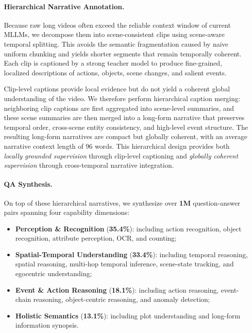 \documentclass[11pt, letterpaper]{template}
\theoremstyle{plain}
\theoremstyle{definition}
\theoremstyle{remark}
\begin{document}
\paragraph{Hierarchical Narrative Annotation.}
Because raw long videos often exceed the reliable context window of current MLLMs, we decompose them into scene-consistent clips using scene-aware temporal splitting. This avoids the semantic fragmentation caused by naive uniform chunking and yields shorter segments that remain temporally coherent. Each clip is captioned by a strong teacher model to produce fine-grained, localized descriptions of actions, objects, scene changes, and salient events.

Clip-level captions provide local evidence but do not yield a coherent global understanding of the video. We therefore perform hierarchical caption merging: neighboring clip captions are first aggregated into scene-level summaries, and these scene summaries are then merged into a long-form narrative that preserves temporal order, cross-scene entity consistency, and high-level event structure. The resulting long-form narratives are compact but globally coherent, with an average narrative context length of 96 words. This hierarchical design provides both \emph{locally grounded supervision} through clip-level captioning and \emph{globally coherent supervision} through cross-temporal narrative integration.

\paragraph{QA Synthesis.}
On top of these hierarchical narratives, we synthesize over \textbf{1M} question-answer pairs spanning four capability dimensions:
\begin{itemize}[leftmargin=*]
    \item \textbf{Perception \& Recognition} (\textbf{35.4\%}): including action recognition, object recognition, attribute perception, OCR, and counting;
    \item \textbf{Spatial-Temporal Understanding} (\textbf{33.4\%}): including temporal reasoning, spatial reasoning, multi-hop temporal inference, scene-state tracking, and egocentric understanding;
    \item \textbf{Event \& Action Reasoning} (\textbf{18.1\%}): including action reasoning, event-chain reasoning, object-centric reasoning, and anomaly detection;
    \item \textbf{Holistic Semantics} (\textbf{13.1\%}): including plot understanding and long-form information synopsis.
\end{itemize}
\end{document}
